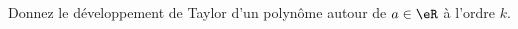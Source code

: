 
\begin{exercice}\label{exoDevel0004}

Donnez le développement de Taylor d'un polynôme autour de $a\in \eR$ à l'ordre $k$.

\end{exercice}
